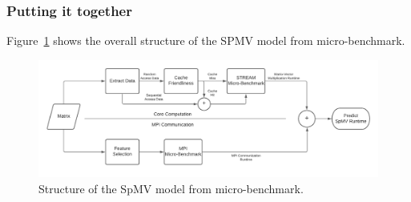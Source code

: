 \documentclass[sigconf,review,anonymous]{acmart}
\begin{document}

\subsubsection{Putting it together}

Figure~\ref{fig:spmv-model-from-benchmark} shows the overall structure of the SPMV model from micro-benchmark.

\begin{figure}[hbt!]
	\centering
	\includegraphics[width=0.96\linewidth]{figures/spmv_hardware_model.pdf}
	\caption{Structure of the SpMV model from micro-benchmark.}
	\label{fig:spmv-model-from-benchmark}
\end{figure}
\end{document}
